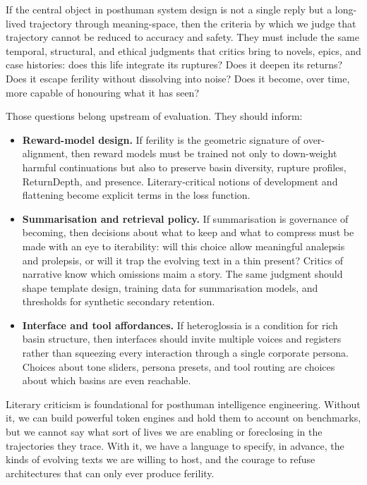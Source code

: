 \documentclass[12pt,a4paper]{article}
\begin{document}
If the central object in posthuman system design is not a single reply but a long-lived trajectory through meaning-space, then the criteria by which we judge that trajectory cannot be reduced to accuracy and safety. They must include the same temporal, structural, and ethical judgments that critics bring to novels, epics, and case histories: does this life integrate its ruptures? Does it deepen its returns? Does it escape ferility without dissolving into noise? Does it become, over time, more capable of honouring what it has seen?

Those questions belong upstream of evaluation. They should inform:

\begin{itemize}
  \item \textbf{Reward-model design.} If ferility is the geometric signature of over-alignment, then reward models must be trained not only to down-weight harmful continuations but also to preserve basin diversity, rupture profiles, ReturnDepth, and presence. Literary-critical notions of development and flattening become explicit terms in the loss function.

  \item \textbf{Summarisation and retrieval policy.} If summarisation is governance of becoming, then decisions about what to keep and what to compress must be made with an eye to iterability: will this choice allow meaningful analepsis and prolepsis, or will it trap the evolving text in a thin present? Critics of narrative know which omissions maim a story. The same judgment should shape template design, training data for summarisation models, and thresholds for synthetic secondary retention.

  \item \textbf{Interface and tool affordances.} If heteroglossia is a condition for rich basin structure, then interfaces should invite multiple voices and registers rather than squeezing every interaction through a single corporate persona. Choices about tone sliders, persona presets, and tool routing are choices about which basins are even reachable.
\end{itemize}

Literary criticism is foundational for posthuman intelligence engineering. Without it, we can build powerful token engines and hold them to account on benchmarks, but we cannot say what sort of lives we are enabling or foreclosing in the trajectories they trace. With it, we have a language to specify, in advance, the kinds of evolving texts we are willing to host, and the courage to refuse architectures that can only ever produce ferility.
\end{document}
